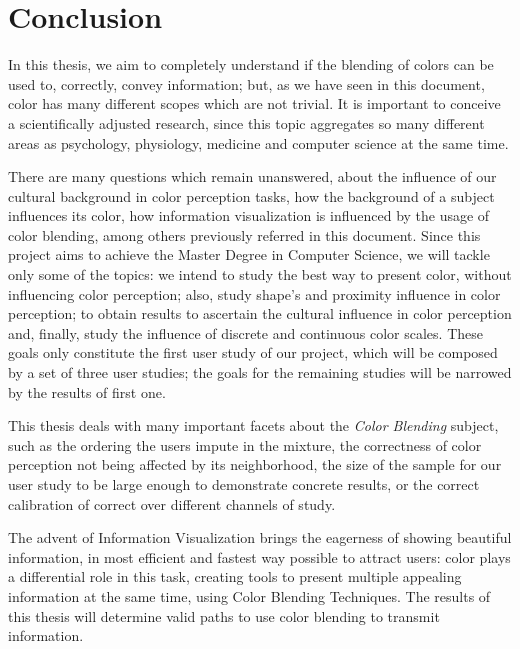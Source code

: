 \documentclass{report}
\begin{document}
\chapter{Conclusion}
In this thesis, we aim to completely understand if the blending of colors can be used to, correctly, convey information; but, as we have seen in this
document, color has many different scopes which are not trivial. It is important to conceive a scientifically adjusted research, since this topic
aggregates so many different areas as psychology, physiology, medicine and computer science at the same time. \par
There are many questions which remain unanswered, about the influence of our cultural background in color perception tasks, how the background of a subject influences its color, how information visualization is influenced by the usage of color blending, among others previously referred in this document. Since this project aims to achieve the Master Degree in Computer Science, we will tackle only some of the topics: we intend to study the best way to present color, without influencing color perception; also, study shape's and proximity influence in color perception; to obtain results to ascertain the cultural influence in color perception and, finally, study the influence of discrete and continuous color scales. These goals only constitute the first user study of our project, which will be composed by a set of three user studies; the goals for the remaining studies will be narrowed by the results of first one. \par
This thesis deals with many important facets about the \emph{Color Blending} subject, such as the ordering the users impute in the mixture, the 
correctness of color perception not being affected by its neighborhood, the size of the sample for our user study to be large enough to demonstrate
concrete results, or the correct calibration of correct over different channels of study. \par
The advent of Information Visualization brings the eagerness of showing beautiful information, in most efficient and fastest way possible to attract
users: color plays a differential role in this task, creating tools to present multiple appealing information at the same time, using Color Blending
Techniques. The results of this thesis will determine valid paths to use color blending to transmit information.
%
%



\end{document}
